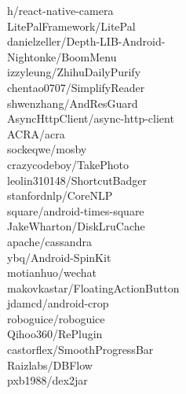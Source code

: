 \documentclass[twoside]{praca}
\begin{document}
\begin{multicols}{3}
h/react-native-camera\\LitePalFramework/LitePal\\danielzeller/Depth-LIB-Android-\\Nightonke/BoomMenu\\izzyleung/ZhihuDailyPurify\\chentao0707/SimplifyReader\\shwenzhang/AndResGuard\\AsyncHttpClient/async-http-client\\ACRA/acra\\sockeqwe/mosby\\crazycodeboy/TakePhoto\\leolin310148/ShortcutBadger\\stanfordnlp/CoreNLP\\square/android-times-square\\JakeWharton/DiskLruCache\\apache/cassandra\\ybq/Android-SpinKit\\motianhuo/wechat\\makovkastar/Floating\-Action\-Button\\jdamcd/android-crop\\roboguice/roboguice\\Qihoo360/RePlugin\\castorflex/Smooth\-Progress\-Bar\\Raizlabs/DBFlow\\pxb1988/dex2jar
\end{multicols}
\end{document}
